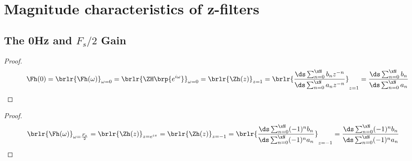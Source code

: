 
\chapter{Magnitude characteristics of z-filters}
\section{The 0Hz and $F_s/2$ Gain}
\begin{proposition}
\end{proposition}
\begin{proof}
%
\begin{align*}\
  \Fh(0) 
     = \brlr{\Fh(\omega)}_{\omega=0}
     = \brlr{\ZH\brp{e^{i\omega}}}_{\omega=0}
     = \brlr{\Zh(z)}_{z=1}
     = \brlr{\frac{\ds\sum_{n=0}^{\xN}b_n z^{-n}}
            {\ds\sum_{n=0}^{\xN}a_n z^{-n}}}_{z=1}
     = \frac{\ds\sum_{n=0}^{\xN}b_n }
            {\ds\sum_{n=0}^{\xN}a_n }
\end{align*}
\end{proof}

\begin{proposition}
\end{proposition}
\begin{proof}
\begin{align*}
  \brlr{\Fh(\omega)}_{\omega=\frac{F_s}{2}} 
    &= \brlr{\Zh(z)}_{z=e^{i\pi}}
     = \brlr{\Zh(z)}_{z=-1}
     = \brlr{\frac{\ds\sum_{n=0}^{\xN}(-1)^n b_n}
                  {\ds\sum_{n=0}^{\xN}(-1)^n a_n}}_{z=-1}
     =       \frac{\ds\sum_{n=0}^{\xN}(-1)^n b_n }
                  {\ds\sum_{n=0}^{\xN}(-1)^n a_n}
\end{align*}
\end{proof}

